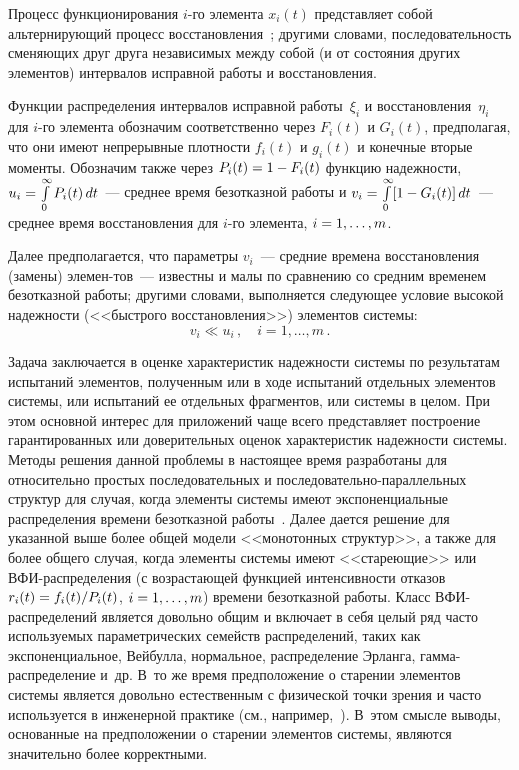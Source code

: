 \begin{multicols}{2}
{}

     Процесс функционирования $i$-го элемента $x_i(t)$  пред\-став\-ля\-ет 
собой альтернирующий процесс вос\-ста\-нов\-ле\-ния~\cite{3-pav}; другими 
словами, последовательность сменяющих друг друга независимых между 
собой (и от состояния других элементов) интервалов исправной работы и 
восстановления. 

Функции распределения интервалов исправной 
работы~$\xi_i$ и восстановления~$\eta_i$ для $i$-го элемента обозначим 
соответственно через $F_i(t)$ и $G_i(t)$, предполагая, что они имеют 
непрерывные плотности $f_i(t)$ и $g_i(t)$ и конечные вторые моменты. 
Обозначим также через $P_i(t)\hm=1-F_i(t)$ функцию надежности, $u_i\hm= 
\int\limits_0^{\infty} P_i(t)\,dt$~---  среднее время безотказной работы и 
$v_i\hm= \int\limits_0^{\infty} [1-G_i(t)]\,dt$~--- среднее время 
восстановления для $i$-го элемента, $i\hm=1, \ldots ,m$.
     
     Далее предполагается, что параметры $v_i$~--- средние времена 
восстановления (замены) элемен-\linebreak тов~--- известны и малы по сравнению со 
средним временем безотказной работы; другими словами, выполняется 
следующее условие высокой надежности (<<быстрого восстановления>>) 
элементов сис\-темы:
     \begin{equation}
     v_i \ll u_i\,,\quad i=1,\ldots , m\,.
     \label{e1-pav}
     \end{equation}

Задача заключается в оценке характеристик надеж\-ности системы по 
результатам испытаний элементов, полученным или в ходе испытаний 
отдельных элементов системы, или испытаний ее отдельных фрагментов, или 
системы в целом. При этом основной интерес для приложений чаще всего 
представляет построение гарантированных или доверительных оценок 
характеристик надежности системы. Методы решения данной проблемы в 
настоящее время разработаны для относительно простых последовательных 
и по\-сле\-до\-ва\-тель\-но-па\-рал\-лель\-ных структур для случая, когда элементы 
системы имеют экспоненциальные распределения времени безотказной 
работы~\cite{3-pav, 4-pav, 6-pav}. Далее дается решение для указанной выше 
более общей модели <<монотонных структур>>, а также для более общего 
случая, когда элементы системы имеют <<стареющие>> или 
ВФИ-рас\-пре\-де\-ле\-ния (с воз\-рас\-та\-ющей функцией интенсивности отказов 
$r_i(t)\hm= f_i(t)/P_i(t)$, $i\hm= 1,\ldots , m$) времени безотказной работы. 
Класс ВФИ-рас\-пре\-де\-ле\-ний является довольно общим и включает в себя 
целый ряд час\-то используемых параметрических семейств распределений, 
таких как экспоненциальное, Вейбулла, нормальное, распределение Эрланга, 
гам\-ма-рас\-пре\-де\-ле\-ние и~др. В~то же время предположение о старении 
элементов сис\-те\-мы является довольно естественным с физической точки 
зрения и часто используется в инженерной практике 
(см., например,~\cite{3-pav, 1-pav, 6-pav}). В~этом смысле выводы, основанные на 
предположении о старении элементов системы, являются значительно более 
корректными.


\end{multicols}
